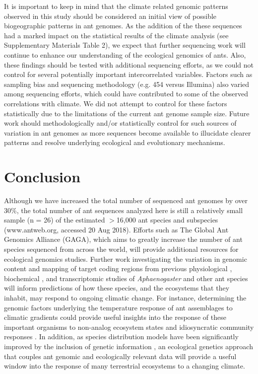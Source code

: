 \documentclass[fleqn,10pt,lineno]{wlpeerj} %
\begin{document}
It is important to keep in mind that the climate related genomic
patterns observed in this study should be considered an initial view
of possible biogeographic patterns in ant genomes. As the addition of
the these sequences had a marked impact on the statistical results of
the climate analysis (see Supplementary Materials
Table 2), we expect that further sequencing
work will continue to enhance our understanding of the ecological
genomics of ants. Also, these findings should be tested with
additional sequencing efforts, as we could not control for several
potentially important intercorrelated variables. Factors such as
sampling bias and sequencing methodology (e.g. 454 versus Illumina)
also varied among sequencing efforts, which could have contributed to
some of the observed correlations with climate. We did not attempt to
control for these factors statistically due to the limitations of the
current ant genome sample size. Future work should methodologically
and/or statistically control for such sources of variation in ant
genomes as more sequences become available to illucidate clearer
patterns and resolve underlying ecological and evolutionary
mechanisms.


\section*{Conclusion}

Although we have increased the total number of sequenced ant genomes
by over 30\%, the total number of ant sequences analyzed here is still
a relatively small sample (n = 26) of the estimated $>$16,000 ant
species and subspecies (www.antweb.org, accessed 20 Aug 2018). Efforts
such as The Global Ant Genomics Alliance (GAGA)\citep{Boomsma2017},
which aims to greatly increase the number of ant species sequenced
from across the world, will provide additional resources for
ecological genomics studies. Further work investigating the variation
in genomic content and mapping of target coding regions from previous
physiological \citep{Nguyen2017}, biochemical \citep{HelmsCahan2017},
and transcriptomic \citep{Stanton-Geddes} studies of
\textit{Aphaenogaster} and other ant species will inform predictions
of how these species, and the ecosystems that they inhabit, may
respond to ongoing climatic change. For instance, determining the
genomic factors underlying the temperature response of ant assemblages
to climatic gradients \citep{Warren2013, Diamond2016, Diamond2017}
could provide useful insights into the response of these important
organisms to non-analog ecosystem states and idiosyncratic community
responses \citep{Bewick2014a}. In addition, as species distribution
models have been significantly improved by the inclusion of genetic
information \citep{Ikeda2016}, an ecological genetics approach that
couples ant genomic and ecologically relevant data will provide a
useful window into the response of many terrestrial ecosystems to a
changing climate.
\end{document}
